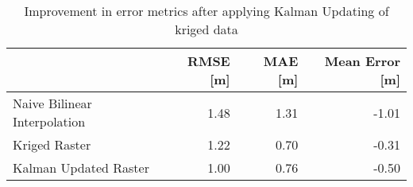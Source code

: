 \begin{table}
\centering
\caption{Improvement in error metrics after applying Kalman Updating of kriged data}
\label{tab:Petten_gebco_raster_error}
\begin{tabular}{lrrr}
\toprule
 & RMSE [m] & MAE [m] & Mean Error [m] \\
\midrule
Naive Bilinear Interpolation & 1.48 & 1.31 & -1.01 \\
Kriged Raster & 1.22 & 0.70 & -0.31 \\
Kalman Updated Raster & 1.00 & 0.76 & -0.50 \\
\bottomrule
\end{tabular}
\end{table}
